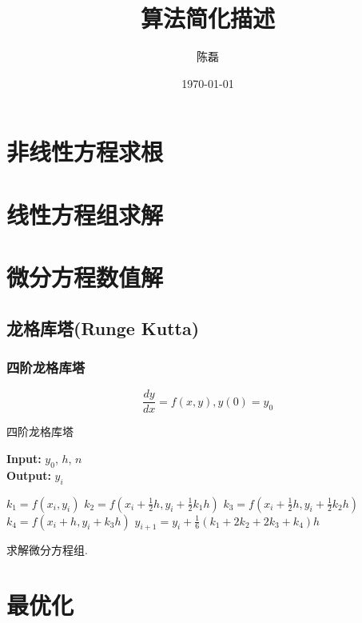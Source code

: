 \documentclass{book}
\begin{document}
\title{算法简化描述}
\author{陈磊}
\date{\today}

\maketitle

\tableofcontents
\listofalgorithms

\chapter{非线性方程求根}

\chapter{线性方程组求解}

\chapter{微分方程数值解}

\section{龙格库塔(Runge Kutta)}
\subsection{四阶龙格库塔}
\begin{equation}
	\frac{dy}{dx}=f(x,y), y(0)=y_0
\end{equation}

\begin{algorithm}
\caption{四阶龙格库塔} %
\hspace*{0.02in} {\bf Input:} %
$y_0$, $h$, $n$\\
\hspace*{0.02in} {\bf Output:} %
$y_i$
\begin{algorithmic}[1]
	\State $k_1=f(x_i,y_i)$
	\State $k_2=f(x_i+\frac{1}{2}h,y_i+\frac{1}{2}k_1h)$
	\State $k_3=f(x_i+\frac{1}{2}h,y_i+\frac{1}{2}k_2h)$
	\State $k_4=f(x_i+h,y_i+k_3h)$
	\State $y_{i+1} = y_i + \frac{1}{6}(k_1+2k_2+2k_3+k_4)h$
\EndFor
\end{algorithmic}
\end{algorithm}

求解微分方程组.

\chapter{最优化}
\end{document}
